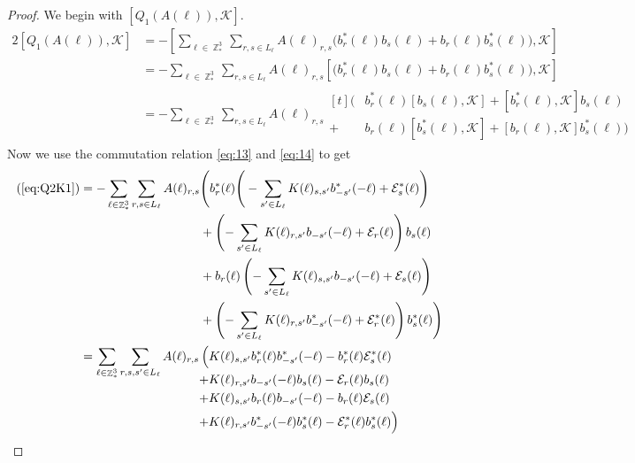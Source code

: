 \documentclass[sn-mathphys,Numbered, a4paper ,nocrop]{sn-jnl}%
\DeclareMathOperator{\Z}{\mathbb{Z}}
\theoremstyle{plain}
\theoremstyle{definition}
\theoremstyle{remark}
\theoremstyle{plain}
\theoremstyle{definition}
\theoremstyle{remark}
\begin{document}
\begin{proof}We begin with $[ Q_1(A(\ell)),\mathcal{K}]$.
    \begin{alignat}{2}
        [ Q_1(A(\ell)),\mathcal{K}] &= -\left[\sum\limits_{\ell \in \Z^3_*}\sum\limits_{r,s \in L_{\ell}}A(\ell)_{r,s}\Big(b^*_{r}(\ell)b_{s}(\ell) + b_{r}(\ell)b^*_{s}(\ell)\Big),\mathcal{K}\right]\\
        &=-\sum\limits_{\ell \in \Z^3_*}\sum\limits_{r,s \in L_{\ell}}A(\ell)_{r,s}\left[\Big(b^*_{r}(\ell)b_{s}(\ell) + b_{r}(\ell)b^*_{s}(\ell)\Big),\mathcal{K}\right]\\
        &=-\sum\limits_{\ell \in \Z^3_*}\sum\limits_{r,s \in L_{\ell}}A(\ell)_{r,s}\begin{aligned}[t]
            \Big(&b^*_{r}(\ell)\left[b_{s}(\ell),\mathcal{K}\right] +\left[b^*_{r}(\ell),\mathcal{K}\right]b_{s}(\ell)\\ + &b_{r}(\ell)\left[b^*_{s}(\ell),\mathcal{K}\right]+ \left[b_{r}(\ell),\mathcal{K}\right]b^*_{s}(\ell)\Big)
        \end{aligned}\label{eq:Q1K1}
    \end{alignat}
    Now we use the commutation relation \eqref{eq:13} and \eqref{eq:14} to get
\begin{alignat}{2}
    (\ref{eq:Q2K1})&=-\sum\limits_{\ell \in \Z^3_*}\sum\limits_{r,s \in L_{\ell}}A(\ell)_{r,s}\begin{aligned}[t]
        &\Bigg(b^*_{r}(\ell)\Bigg(-\sum\limits_{s'\in L_{\ell}}K(\ell)_{s,s'}b^*_{-s'}(-\ell) + \mathcal{E}^*_{s}(\ell)\Bigg)\\ &+ \left(-\sum\limits_{s'\in L_{\ell}}K(\ell)_{r,s'}b_{-s'}(-\ell) + \mathcal{E}_{r}(\ell)\right)b_{s}(\ell)\\&+ b_{r}(\ell)\left(-\sum\limits_{s'\in L_{\ell}}K(\ell)_{s,s'}b_{-s'}(-\ell) + \mathcal{E}_{s}(\ell)\right)\\ &+ \left(-\sum\limits_{s'\in L_{\ell}}K(\ell)_{r,s'}b^*_{-s'}(-\ell) + \mathcal{E}^*_{r}(\ell)\right)b^*_{s}(\ell) \Bigg)        
    \end{aligned}\\
    &=\sum\limits_{\ell \in \Z^3_*}\sum\limits_{r,s,s' \in L_{\ell}}A(\ell)_{r,s}\begin{aligned}[t]
        \Big(&K(\ell)_{s,s'}b^*_{r}(\ell)b^*_{-s'}(-\ell) -b^*_{r}(\ell) \mathcal{E}^*_{s}(\ell)\\ + &K(\ell)_{r,s'}b_{-s'}(-\ell)b_{s}(\ell) - \mathcal{E}_{r}(\ell)b_{s}(\ell)\\+& K(\ell)_{s,s'}b_{r}(\ell)b_{-s'}(-\ell) - b_{r}(\ell)\mathcal{E}_{s}(\ell)\\ + &K(\ell)_{r,s'}b^*_{-s'}(-\ell)b^*_{s}(\ell) - \mathcal{E}^*_{r}(\ell)b^*_{s}(\ell) \Big) 

\end{aligned}
\end{alignat}
\end{proof}
\end{document}
